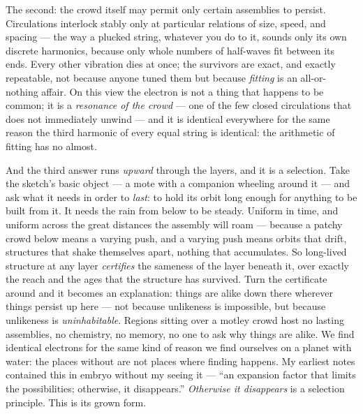 \documentclass[fontsize=11pt,paper=a4,pagesize=auto,parskip=half-]{scrbook}
\begin{document}
The second: the crowd itself may permit only certain assemblies to persist. Circulations interlock stably only at particular relations of size, speed, and spacing --- the way a plucked string, whatever you do to it, sounds only its own discrete harmonics, because only whole numbers of half-waves fit between its ends. Every other vibration dies at once; the survivors are exact, and exactly repeatable, not because anyone tuned them but because \emph{fitting} is an all-or-nothing affair. On this view the electron is not a thing that happens to be common; it is a \emph{resonance of the crowd} --- one of the few closed circulations that does not immediately unwind --- and it is identical everywhere for the same reason the third harmonic of every equal string is identical: the arithmetic of fitting has no almost.

And the third answer runs \emph{upward} through the layers, and it is a selection. Take the sketch's basic object --- a mote with a companion wheeling around it --- and ask what it needs in order to \emph{last}: to hold its orbit long enough for anything to be built from it. It needs the rain from below to be steady. Uniform in time, and uniform across the great distances the assembly will roam --- because a patchy crowd below means a varying push, and a varying push means orbits that drift, structures that shake themselves apart, nothing that accumulates. So long-lived structure at any layer \emph{certifies} the sameness of the layer beneath it, over exactly the reach and the ages that the structure has survived. Turn the certificate around and it becomes an explanation: things are alike down there wherever things persist up here --- not because unlikeness is impossible, but because unlikeness is \emph{uninhabitable}. Regions sitting over a motley crowd host no lasting assemblies, no chemistry, no memory, no one to ask why things are alike. We find identical electrons for the same kind of reason we find ourselves on a planet with water: the places without are not places where finding happens. My earliest notes contained this in embryo without my seeing it --- ``an expansion factor that limits the possibilities; otherwise, it disappears.'' \emph{Otherwise it disappears} is a selection principle. This is its grown form.
\end{document}
